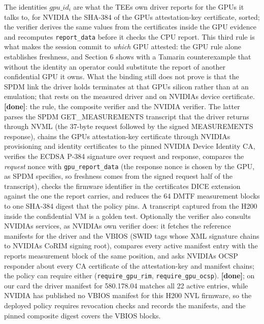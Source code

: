 \documentclass[letterpaper,twocolumn,10pt]{article}
\begin{document}
The identities \(gpu\_id_i\) are what the TEE\textquotesingle s own driver reports for the GPUs it talks to, for NVIDIA the SHA-384 of the GPU\textquotesingle s attestation-key certificate, sorted; the verifier derives the same values from the certificates inside the GPU evidence and recomputes \texttt{report\_data} before it checks the CPU report. This third rule is what makes the session commit to \emph{which} GPU attested: the GPU rule alone establishes freshness, and Section 6 shows with a Tamarin counterexample that without the identity an operator could substitute the report of another confidential GPU it owns. What the binding still does not prove is that the SPDM link the driver holds terminates at that GPU\textquotesingle s silicon rather than at an emulation; that rests on the measured driver and on NVIDIA\textquotesingle s device certificate. \textbf{{[}done{]}}: the rule, the composite verifier and the NVIDIA verifier. The latter parses the SPDM GET\_MEASUREMENTS transcript that the driver returns through NVML (the 37-byte request followed by the signed MEASUREMENTS response), chains the GPU\textquotesingle s attestation-key certificate through NVIDIA\textquotesingle s provisioning and identity certificates to the pinned NVIDIA Device Identity CA, verifies the ECDSA P-384 signature over request and response, compares the \emph{request} nonce with \texttt{gpu\_report\_data} (the response nonce is chosen by the GPU, as SPDM specifies, so freshness comes from the signed request half of the transcript), checks the firmware identifier in the certificate\textquotesingle s DICE extension against the one the report carries, and reduces the 64 DMTF measurement blocks to one SHA-384 digest that the policy pins. A transcript captured from the H200 inside the confidential VM is a golden test. Optionally the verifier also consults NVIDIA\textquotesingle s services, as NVIDIA\textquotesingle s own verifier does: it fetches the reference manifests for the driver and the VBIOS (SWID tags whose XML signature chains to NVIDIA\textquotesingle s CoRIM signing root), compares every active manifest entry with the report\textquotesingle s measurement block of the same position, and asks NVIDIA\textquotesingle s OCSP responder about every CA certificate of the attestation-key and manifest chains; the policy can require either (\texttt{require\_gpu\_rim}, \texttt{require\_gpu\_ocsp}). \textbf{{[}done{]}}; on our card the driver manifest for 580.178.04 matches all 22 active entries, while NVIDIA has published no VBIOS manifest for this H200 NVL firmware, so the deployed policy requires revocation checks and records the manifests, and the pinned composite digest covers the VBIOS blocks.
\end{document}
